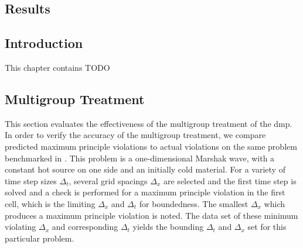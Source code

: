 
\begin{center}
\section{Results}
\label{sec:Results}
\end{center}

\aboveSubSecSkip

\subsection{Introduction}
\label{sec:Results-Intro}

\noindent
	\indent This chapter contains TODO
				
\belowSubSecSkip

\aboveSubSecSkip

\subsection{Multigroup Treatment}
\label{sec:Results-multigroup}

\noindent
	\indent This section evaluates the effectiveness of the multigroup treatment of the \gls{dmp}.  In order to verify the accuracy of the multigroup treatment, we compare predicted maximum principle violations to actual violations on the same problem benchmarked in \cite{WolLarDen}.  This problem is a one-dimensional Marshak wave, with a constant hot source on one side and an initially cold material. For a variety of time step sizes $\Delta_t$, several grid spacings $\Delta_x$ are selected and the first time step is solved and a check is performed for a maximum principle violation in the first cell, which is the limiting $\Delta_x$ and $\Delta_t$ for boundedness.  The smallest $\Delta_x$ which produces a maximum principle violation is noted.  The data set of these minimum violating $\Delta_x$ and corresponding $\Delta_t$ yields the bounding $\Delta_t$ and $\Delta_x$ set for this particular problem.

